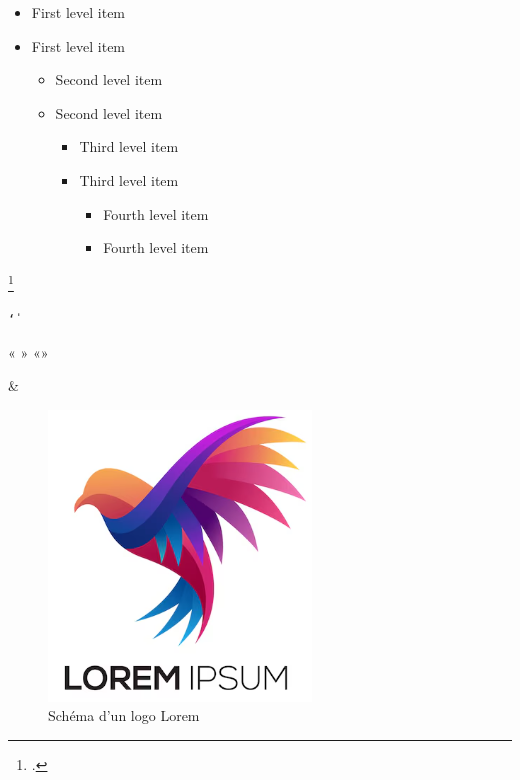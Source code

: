 %
%

\medskip
\bigskip

\begin{itemize}
   \item First level item
   \item First level item
   \begin{itemize}
     \item Second level item
     \item Second level item
     \begin{itemize}
       \item Third level item
       \item Third level item
       \begin{itemize}
         \item Fourth level item
         \item Fourth level item
       \end{itemize}
     \end{itemize}
   \end{itemize}
 \end{itemize}

 
\footcite{loremIpsum}

\texttt{\char`\|}

« »
«»

{\&}
\textunderscore{}

\begin{figure}[H]
    \centering
    \includegraphics[width=0.85\linewidth]{Images/10/lorem.png}
    \caption{Schéma d'un logo Lorem}
    \label{fig:Lorem}
\end{figure}

